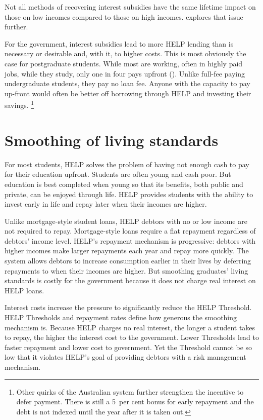 \documentclass[embargoed]{grattan}
\begin{document}
Not all methods of recovering interest subsidies have the same lifetime impact on those on low incomes compared to those on high incomes.
 explores that issue further.

For the government, interest subsidies lead to more \gls{HELP} lending than is necessary or desirable and, with it, to higher costs.
This is most obviously the case for postgraduate students.
While most are working, often in highly paid jobs, while they study, only one in four pays upfront ().
Unlike full-fee paying undergraduate students, they pay no loan fee.
Anyone with the capacity to pay up-front would often be better off borrowing through \gls{HELP} and investing their savings.%
\footnote{Other quirks of the Australian system further strengthen the incentive to defer payment.
There is still a 5~per cent bonus for early repayment and the debt is not indexed until the year after it is taken out.}

\section{Smoothing of living standards}\label{smoothing-of-living-standards}

For most students, \gls{HELP} solves the problem of having not enough cash to pay for their education upfront.
Students are often young and cash poor.
But education is best completed when young so that its benefits, both public and private, can be enjoyed through life.
\gls{HELP} provides students with the ability to invest early in life and repay later when their incomes are higher.

Unlike mortgage-style student loans, \gls{HELP} debtors with no or low income are not required to repay.
Mortgage-style loans require a flat repayment regardless of debtors' income level.
\gls{HELP}'s repayment mechanism is progressive: debtors with higher incomes make larger repayments each year and repay more quickly.
The system allows debtors to increase consumption earlier in their lives by deferring repayments to when their incomes are higher.
But smoothing graduates' living standards is costly for the government because it does not charge real interest on \gls{HELP} loans.

Interest costs increase the pressure to significantly reduce the \gls{HELP} \gls{Threshold}.
\gls{HELP} \gls{Threshold}s and repayment rates define how generous the smoothing mechanism is.
Because \gls{HELP} charges no real interest, the longer a student takes to repay, the higher the interest cost to the government.
Lower \gls{Threshold}s lead to faster repayment and lower cost to government.
Yet the \gls{Threshold} cannot be so low that it violates \gls{HELP}'s goal of providing debtors with a risk management mechanism.
\end{document}
